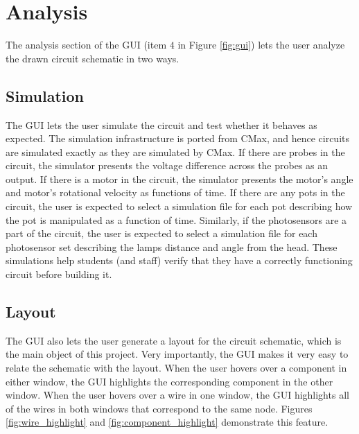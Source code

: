 \section{Analysis}

The analysis section of the GUI (item $4$ in Figure \ref{fig:gui}) lets the user
analyze the drawn circuit schematic in two ways.

\subsection{Simulation}

The GUI lets the user simulate the circuit and test whether it behaves as
expected. The simulation infrastructure is ported from CMax, and hence circuits
are simulated exactly as they are simulated by CMax. If there are probes in the
circuit, the simulator presents the voltage difference across the probes as an
output. If there is a motor in the circuit, the simulator presents the motor's
angle and motor's rotational velocity as functions of time. If there are any
pots in the circuit, the user is expected to select a simulation file for each
pot describing how the pot is manipulated as a function of time. Similarly,
if the photosensors are a part of the circuit, the user is expected to select
a simulation file for each photosensor set describing the lamps distance and
angle from the head. These simulations help students (and staff) verify that
they have a correctly functioning circuit before building it.

\subsection{Layout}

The GUI also lets the user generate a layout for the circuit schematic, which is
the main object of this project. Very importantly, the GUI makes it very easy to
relate the schematic with the layout. When the user hovers over a component in
either window, the GUI highlights the corresponding component in the other
window. When the user hovers over a wire in one window, the GUI highlights all
of the wires in both windows that correspond to the same node. Figures
\ref{fig:wire_highlight} and \ref{fig:component_highlight} demonstrate this
feature.

